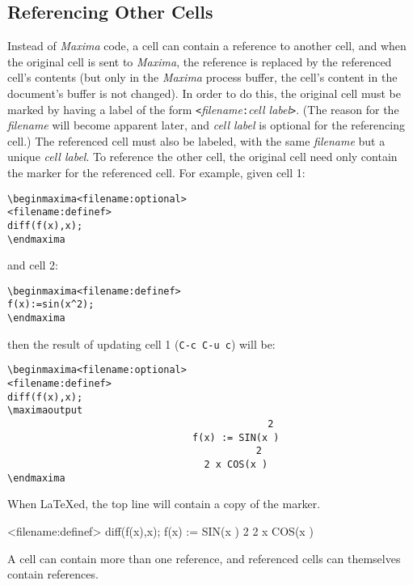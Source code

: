 \documentclass{article}
\newcommand{\mx}{\textsl{\sffamily Maxima}}
\begin{document}
\subsection{Referencing Other Cells}

\noindent
Instead of \mx{} code, a cell can contain a reference to another cell,
and when the original cell is sent to \mx{}, the reference is replaced
by the referenced cell's contents (but only in the \mx{} process
buffer, the cell's 
content in the document's buffer is not changed).  In order to do
this, the original cell must be marked by having a label of the form
\texttt{<}\textsl{filename}\texttt{:}\textsl{cell label}\texttt{>}.
(The reason for the \textsl{filename} will become apparent later, and
\textsl{cell label} is optional for the referencing cell.)
The referenced cell must also be labeled, with the same
\textsl{filename} but a unique \textsl{cell label}.  To reference the
other cell, the original cell need only contain the marker for the
referenced cell.  For example, given cell 1:
\begin{verbatim}
\beginmaxima<filename:optional>
<filename:definef>
diff(f(x),x);
\endmaxima
\end{verbatim}
\noindent
and cell 2:
\begin{verbatim}
\beginmaxima<filename:definef>
f(x):=sin(x^2);
\endmaxima
\end{verbatim}
\noindent
then the result of updating cell 1 (\texttt{C-c C-u c}) will be:
\begin{verbatim}
\beginmaxima<filename:optional>
<filename:definef>
diff(f(x),x);
\maximaoutput
                                             2
                                f(x) := SIN(x )
                                           2
                                  2 x COS(x )
\endmaxima
\end{verbatim}
\noindent
When \LaTeX{}ed, the top line will contain a copy of the marker.

<filename:definef>
diff(f(x),x);
                                f(x) := SIN(x )
                                           2
                                  2 x COS(x )
\endmaxima

A cell can contain more than one reference, and referenced cells can
themselves contain references.  
\end{document}
